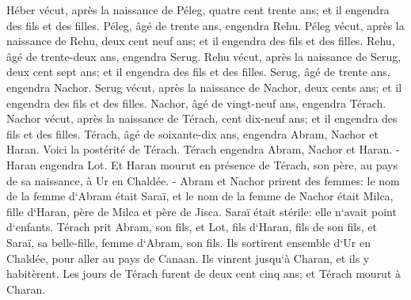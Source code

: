 \verse Héber vécut, après la naissance de Péleg, quatre cent trente ans; et il engendra des fils et des filles. 
\verse Péleg, âgé de trente ans, engendra Rehu. 
\verse Péleg vécut, après la naissance de Rehu, deux cent neuf ans; et il engendra des fils et des filles. 
\verse Rehu, âgé de trente-deux ans, engendra Serug. 
\verse Rehu vécut, après la naissance de Serug, deux cent sept ans; et il engendra des fils et des filles. 
\verse Serug, âgé de trente ans, engendra Nachor. 
\verse Serug vécut, après la naissance de Nachor, deux cents ans; et il engendra des fils et des filles. 
\verse Nachor, âgé de vingt-neuf ans, engendra Térach. 
\verse Nachor vécut, après la naissance de Térach, cent dix-neuf ans; et il engendra des fils et des filles. 
\verse Térach, âgé de soixante-dix ans, engendra Abram, Nachor et Haran. 
\verse Voici la postérité de Térach. Térach engendra Abram, Nachor et Haran. -Haran engendra Lot. 
\verse Et Haran mourut en présence de Térach, son père, au pays de sa naissance, à Ur en Chaldée. - 
\verse Abram et Nachor prirent des femmes: le nom de la femme d`Abram était Saraï, et le nom de la femme de Nachor était Milca, fille d`Haran, père de Milca et père de Jisca. 
\verse Saraï était stérile: elle n`avait point d`enfants. 
\verse Térach prit Abram, son fils, et Lot, fils d`Haran, fils de son fils, et Saraï, sa belle-fille, femme d`Abram, son fils. Ils sortirent ensemble d`Ur en Chaldée, pour aller au pays de Canaan. Ils vinrent jusqu`à Charan, et ils y habitèrent. 
\verse Les jours de Térach furent de deux cent cinq ans; et Térach mourut à Charan. 

